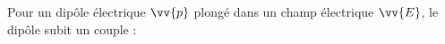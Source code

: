 ﻿\documentclass[a4paper]{article}
\begin{document}
\pagestyle{fancy}
\fancyhf{}
\setlength{\headheight}{15pt}

\begin{center}
	\large{}
\end{center}


Pour un dipôle électrique \(\vv{p}\) plongé dans un champ électrique \(\vv{E}\), le dipôle subit un couple :\begin{center}\end{center}
\end{document}
